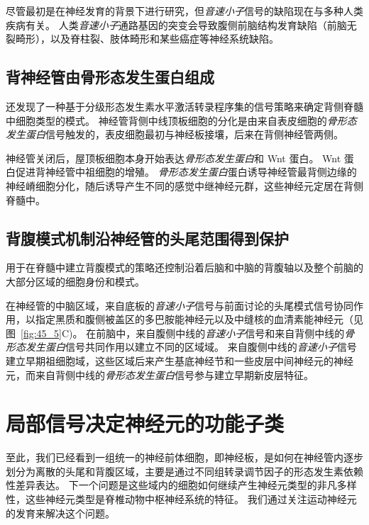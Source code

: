 尽管最初是在神经发育的背景下进行研究，但\textit{音速小子}信号的缺陷现在与多种人类疾病有关。
人类\textit{音速小子}通路基因的突变会导致腹侧前脑结构发育缺陷（前脑无裂畸形），以及脊柱裂、肢体畸形和某些癌症等神经系统缺陷。



\subsection{背神经管由骨形态发生蛋白组成}

还发现了一种基于分级形态发生素水平激活转录程序集的信号策略来确定背侧脊髓中细胞类型的模式。
神经管背侧中线顶板细胞的分化是由来自表皮细胞的\textit{骨形态发生蛋白}信号触发的，表皮细胞最初与神经板接壤，后来在背侧神经管两侧。


神经管关闭后，屋顶板细胞本身开始表达\textit{骨形态发生蛋白}和 Wnt 蛋白。
Wnt 蛋白促进背神经管中祖细胞的增殖。
\textit{骨形态发生蛋白}蛋白诱导神经管最背侧边缘的神经嵴细胞分化，随后诱导产生不同的感觉中继神经元群，这些神经元定居在背侧脊髓中。



\subsection{背腹模式机制沿神经管的头尾范围得到保护}

用于在脊髓中建立背腹模式的策略还控制沿着后脑和中脑的背腹轴以及整个前脑的大部分区域的细胞身份和模式。


在神经管的中脑区域，来自底板的\textit{音速小子}信号与前面讨论的头尾模式信号协同作用，以指定黑质和腹侧被盖区的多巴胺能神经元以及中缝核的血清素能神经元（见图~\ref{fig:45_5}C)。
在前脑中，来自腹侧中线的\textit{音速小子}信号和来自背侧中线的\textit{骨形态发生蛋白}信号共同作用以建立不同的区域域。
来自腹侧中线的\textit{音速小子}信号建立早期祖细胞域，这些区域后来产生基底神经节和一些皮层中间神经元的神经元，而来自背侧中线的\textit{骨形态发生蛋白}信号参与建立早期新皮层特征。



\section{局部信号决定神经元的功能子类}

至此，我们已经看到一组统一的神经前体细胞，即神经板，是如何在神经管内逐步划分为离散的头尾和背腹区域，主要是通过不同组转录调节因子的形态发生素依赖性差异表达。
下一个问题是这些域内的细胞如何继续产生神经元类型的非凡多样性，这些神经元类型是脊椎动物中枢神经系统的特征。
我们通过关注运动神经元的发育来解决这个问题。


